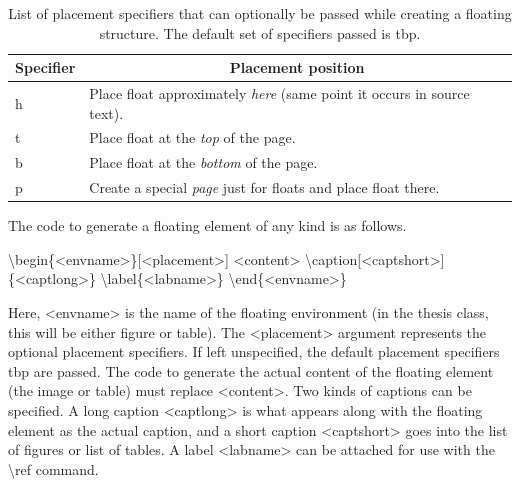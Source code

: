 \documentclass[twoside,openany]{thesis}
\begin{document}
\begin{table}
    \begin{center}
        \begin{tabular}{|l|l|}
            \hline
            \multicolumn{1}{|c|}{Specifier} & \multicolumn{1}{|c|}{Placement position}\\
            \hline
            \hline
            {\ttfamily h} & Place float approximately {\itshape here} (same point it occurs in source text).\\
            {\ttfamily t} & Place float at the {\itshape top} of the page.\\
            {\ttfamily b} & Place float at the {\itshape bottom} of the page.\\
            {\ttfamily p} & Create a special {\itshape page} just for floats and place float there.\\
            \hline
        \end{tabular}
    \end{center}
    \caption[Floating structure placement specifiers]{
        List of placement specifiers that can optionally be passed while creating a floating structure.
        The default set of specifiers passed is {\ttfamily tbp}.
    }
    \label{tab:Float placement specifiers}
\end{table}

The code to generate a floating element of any kind is as follows.

{\ttfamily
    \textbackslash begin\{<envname>\}[<placement>]\linebreak
        \null\quad<content>\linebreak
        \null\quad\textbackslash caption[<captshort>]\{<captlong>\}\linebreak
        \null\quad\textbackslash label\{<labname>\}\linebreak
    \textbackslash end\{<envname>\}
}

Here, {\ttfamily<envname>} is the name of the floating environment (in the {\ttfamily thesis} class, this will be either {\ttfamily figure} or {\ttfamily table}).
The {\ttfamily<placement>} argument represents the optional placement specifiers.
If left unspecified, the default placement specifiers {\ttfamily tbp} are passed.
The code to generate the actual content of the floating element (the image or table) must replace {\ttfamily<content>}.
Two kinds of captions can be specified.
A long caption {\ttfamily<captlong>} is what appears along with the floating element as the actual caption, and a short caption {\ttfamily<captshort>} goes into the list of figures or list of tables.
A label {\ttfamily<labname>} can be attached for use with the {\ttfamily\textbackslash ref} command.
\end{document}
